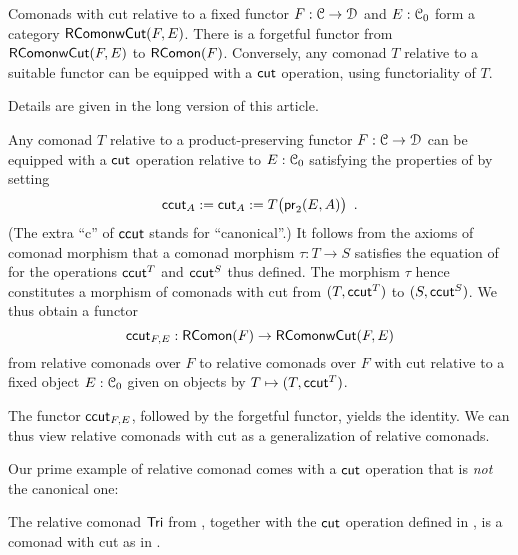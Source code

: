 \documentclass[a4paper,USenglish]{lipics}
\begin{document}
Comonads with cut relative to a fixed functor $F:{\mathcal{C}}\to\mathcal{D}$ and $E:{\mathcal{C}}_0$ form a category $\mathsf{\mathsf{RComon} wCut}(F,E)$.
There is a forgetful functor from $\mathsf{\mathsf{RComon} wCut}(F,E)$ to $\mathsf{RComon}(F)$.
Conversely, any comonad $T$ relative to a suitable functor can be equipped with a $\mathsf{cut}$ operation, using functoriality of $T$.
%
\begin{Short}
 Details are given in the long version of this article.
\end{Short}

\begin{Long}
\begin{rem}\label{canonical_cut}
 Any comonad $T$ relative to a product-preserving functor $F:{\mathcal{C}}\to\mathcal{D}$  can be equipped with a $\mathsf{cut}$ operation relative to 
 $E:{\mathcal{C}}_0$ satisfying the properties of  by setting
   \[ \mathsf{ccut}_A := \mathsf{cut}_A := T\bigl(\mathsf{pr}_2(E,A)\bigr) \enspace . \]
 (The extra \enquote{c} of $\mathsf{ccut}$ stands for \enquote{canonical}.)
 It follows from the axioms of comonad morphism that a comonad morphism $\tau : T\to S$ satisfies the equation of  
 for the  operations $\mathsf{ccut}^T$ and $\mathsf{ccut}^S$ thus defined. The morphism $\tau$ hence constitutes a morphism of comonads with cut from $(T,\mathsf{ccut}^T)$ to $(S,\mathsf{ccut}^S)$.
 We thus obtain a functor 
 \[ \mathsf{ccut}_{F,E} : \mathsf{RComon}(F) \to \mathsf{\mathsf{RComon} wCut}(F,E)\]
 from relative comonads over $F$ to relative comonads over $F$ with cut relative to a fixed object $E:{\mathcal{C}}_0$ given on 
 objects by $T\mapsto (T,\mathsf{ccut}^T)$.
\end{rem}

The functor $\mathsf{ccut}_{F,E}$, followed by the forgetful functor, yields the identity. We can thus view
relative comonads with cut as a generalization of relative comonads.
\end{Long}

\begin{Long}
Our prime example of relative comonad comes with a $\mathsf{cut}$ operation that is \emph{not} the canonical one:
\end{Long}

\begin{ex}%
\label{def:cut_for_tri}
  The relative comonad $\mathsf{Tri}$ from , together with the $\mathsf{cut}$ operation defined in , 
  is a comonad with cut as in .
\end{ex}
\end{document}
